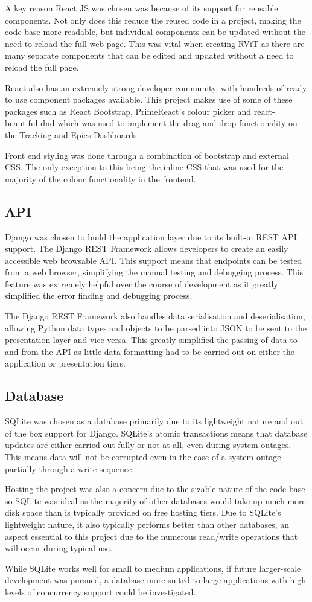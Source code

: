 \documentclass[l4proj.tex]{subfiles}
\begin{document}
A key reason React JS was chosen was because of its support for reusable components. Not only does this reduce the reused code in a project, making the code base more readable, but individual components can be updated without the need to reload the full web-page. This was vital when creating RViT as there are many separate components that can be edited and updated without a need to reload the full page. 

React also has an extremely strong developer community, with hundreds of ready to use component packages available. This project makes use of some of these packages such as React Bootstrap, PrimeReact's colour picker and react-beautiful-dnd which was used to implement the drag and drop functionality on the Tracking and Epics Dashboards.

Front end styling was done through a combination of bootstrap and external CSS. The only exception to this being the inline CSS that was used for the majority of the colour functionality in the frontend.

\subsection{API}
Django was chosen to build the application layer due to its built-in REST API support. The Django REST Framework allows developers to create an easily accessible web browsable API. This support means that endpoints can be tested from a web browser, simplifying the manual testing and debugging process. This feature was extremely helpful over the course of development as it greatly simplified the error finding and debugging process. 

The Django REST Framework also handles data serialisation and deserialisation, allowing Python data types and objects to be parsed into JSON to be sent to the presentation layer and vice versa. This greatly simplified the passing of data to and from the API as little data formatting had to be carried out on either the application or presentation tiers. 


\subsection{Database}
SQLite was chosen as a database primarily due to its lightweight nature and out of the box support for Django. SQLite's atomic transactions means that database updates are either carried out fully or not at all, even during system outages. This means data will not be corrupted even in the case of a system outage partially through a write sequence.

Hosting the project was also a concern due to the sizable nature of the code base so SQLite was ideal as the majority of other databases would take up much more disk space than is typically provided on free hosting tiers. Due to SQLite's lightweight nature, it also typically performs better than other databases, an aspect essential to this project due to the numerous read/write operations that will occur during typical use.

While SQLite works well for small to medium applications, if future larger-scale development was pursued, a database more suited to large applications with high levels of concurrency support could be investigated.
\end{document}
